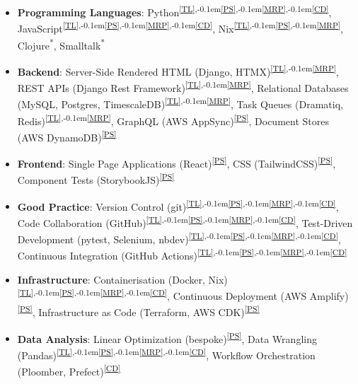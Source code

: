 \documentclass[a4paper,11pt]{article}
\newcommand{\skillref}[1]{\textsuperscript{\ref{#1}}}
\newcommand{\footerref}{\textsuperscript{*}}
\newcommand{\ssep}{\textsuperscript{,\kern-0.1em}}
\begin{document}
\begin{minipage}[t]{0.97\textwidth}
  \begin{itemize}[nosep, leftmargin=2em, itemsep=4pt]

      \item \textbf{Programming Languages}:
      Python\skillref{TL}\ssep\skillref{PS}\ssep\skillref{MRP}\ssep\skillref{CD},
      JavaScript\skillref{TL}\ssep\skillref{PS}\ssep\skillref{MRP}\ssep\skillref{CD},
      Nix\skillref{TL}\ssep\skillref{PS}\ssep\skillref{MRP},
      Clojure\footerref,
      Smalltalk\footerref

      \item \textbf{Backend}:
      Server-Side Rendered HTML (Django, HTMX)\skillref{TL}\ssep\skillref{MRP},
      REST APIs (Django Rest Framework)\skillref{TL}\ssep\skillref{MRP},
      Relational Databases (MySQL, Postgres, TimescaleDB)\skillref{TL}\ssep\skillref{MRP},
      Task Queues (Dramatiq, Redis)\skillref{TL}\ssep\skillref{MRP},
      GraphQL (AWS AppSync)\skillref{PS},
      Document Stores (AWS DynamoDB)\skillref{PS}

      \item \textbf{Frontend}:
      Single Page Applications (React)\skillref{PS},
      CSS (TailwindCSS)\skillref{PS},
      Component Tests (StorybookJS)\skillref{PS}

      \item \textbf{Good Practice}:
      Version Control (git)\skillref{TL}\ssep\skillref{PS}\ssep\skillref{MRP}\ssep\skillref{CD},
      Code Collaboration (GitHub)\skillref{TL}\ssep\skillref{PS}\ssep\skillref{MRP}\ssep\skillref{CD},
      Test-Driven Development (pytest, Selenium, nbdev)\skillref{TL}\ssep\skillref{PS}\ssep\skillref{MRP}\ssep\skillref{CD},
      Continuous Integration (GitHub Actions)\skillref{TL}\ssep\skillref{PS}\ssep\skillref{MRP}\ssep\skillref{CD}

      \item \textbf{Infrastructure}:
      Containerisation (Docker, Nix)\skillref{TL}\ssep\skillref{PS}\ssep\skillref{MRP}\ssep\skillref{CD},
      Continuous Deployment (AWS Amplify)\skillref{PS},
      Infrastructure as Code (Terraform, AWS CDK)\skillref{PS}

      \item \textbf{Data Analysis}:
      Linear Optimization (bespoke)\skillref{PS},
      Data Wrangling (Pandas)\skillref{TL}\ssep\skillref{PS}\ssep\skillref{MRP}\ssep\skillref{CD},
      Workflow Orchestration (Ploomber, Prefect)\skillref{CD}

  \end{itemize}
\end{minipage}

\end{document}
